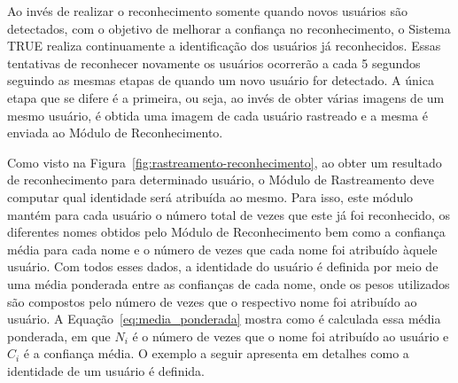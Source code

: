 	
	Ao invés de realizar o reconhecimento somente quando novos usuários são detectados, com o objetivo de melhorar a confiança no reconhecimento, o Sistema TRUE realiza continuamente a identificação dos usuários já reconhecidos. Essas tentativas de reconhecer novamente os usuários ocorrerão a cada 5 segundos seguindo as mesmas etapas de quando um novo usuário for detectado. A única etapa que se difere é a primeira, ou seja, ao invés de obter várias imagens de um mesmo usuário, é obtida uma imagem de cada usuário rastreado e a mesma é enviada ao Módulo de Reconhecimento.

	Como visto na Figura~\ref{fig:rastreamento-reconhecimento}, ao obter um resultado de reconhecimento para determinado usuário, o Módulo de Rastreamento deve computar qual identidade será atribuída ao mesmo. Para isso, este módulo mantém para cada usuário o número total de vezes que este já foi reconhecido, os diferentes nomes obtidos pelo Módulo de Reconhecimento bem como a confiança média para cada nome e o número de vezes que cada nome foi atribuído àquele usuário. Com todos esses dados, a identidade do usuário é definida por meio de uma média ponderada entre as confianças de cada nome, onde os pesos utilizados são compostos pelo número de vezes que o respectivo nome foi atribuído ao usuário. A Equação~\ref{eq:media_ponderada} mostra como é calculada essa média ponderada, em que $\displaystyle N_i$ é o número de vezes que o nome foi atribuído ao usuário e $\displaystyle C_i$ é a confiança média. O exemplo a seguir apresenta em detalhes como a identidade de um usuário é definida.

